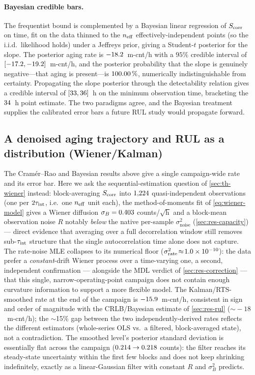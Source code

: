 \paragraph{Bayesian credible bars.} The frequentist bound is complemented by a
Bayesian linear regression of $S_{\mathrm{corr}}$ on time, fit on the data thinned to the
$n_{\mathrm{eff}}$ effectively-independent points (so the i.i.d.\ likelihood holds) under a
Jeffreys prior, giving a Student-$t$ posterior for the slope. The posterior aging
rate is $-18.2$~m-cnt/h with a $95\%$ credible interval of
$[-17.2,-19.2]$~m-cnt/h, and the posterior probability that
the slope is genuinely negative---that aging is present---is
$100.00\,\%$, numerically indistinguishable from certainty. Propagating
the slope posterior through the detectability relation gives a credible interval
of $[33,36]$~h on the minimum observation time, bracketing
the $34$~h point estimate. The two paradigms agree, and the Bayesian
treatment supplies the calibrated error bars a future RUL study would propagate
forward.

\subsection{A denoised aging trajectory and RUL as a distribution (Wiener/Kalman)}
\label{sec:res-wiener}
The Cram\'er--Rao and Bayesian results above give a single campaign-wide rate
and its error bar. Here we ask the sequential-estimation question of
\cref{sec:th-wiener} instead: block-averaging $S_{\mathrm{corr}}$ into $1{,}224$
quasi-independent observations (one per $2\tau_{\mathrm{int}}$, i.e.\ one $n_{\mathrm{eff}}$ unit
each), the method-of-moments fit of \cref{eq:wiener-model} gives a Wiener
diffusion $\sigma_B=0.403$ counts/$\sqrt{\text{h}}$ and a
block-mean observation noise $R$ notably \emph{below} the native
per-sample $\sigma_{\text{noise}}^2$ (\cref{sec:res-capacity}) --- direct
evidence that averaging over a full decorrelation window still removes
sub-$\tau_{\mathrm{int}}$ structure that the single autocorrelation time alone does not
capture. The rate-noise MLE collapses to its numerical floor
($\sigma_{\mathrm{rate}}^2\!\approx\!1.0\times10^{-10}$): the data prefer a
\emph{constant}-drift Wiener process over a time-varying one, a second,
independent confirmation --- alongside the MDL verdict of
\cref{sec:res-correction} --- that this single, narrow-operating-point
campaign does not contain enough curvature information to support a more
flexible model. The Kalman/RTS-smoothed rate at the end of the campaign is
$-15.9$~m-cnt/h, consistent in sign and order of magnitude with
the CRLB/Bayesian estimate of \cref{sec:res-rul} ($\sim\!-18$~m-cnt/h); the
$\sim$15\% gap between the two independently-derived rates reflects the
different estimators (whole-series OLS vs.\ a filtered, block-averaged
state), not a contradiction. The smoothed level's posterior standard
deviation is essentially flat across the campaign
($0.214\to0.218$ counts): the filter reaches
its steady-state uncertainty within the first few blocks and does not
keep shrinking indefinitely, exactly as a linear-Gaussian filter with
constant $R$ and $\sigma_B^2$ predicts.

